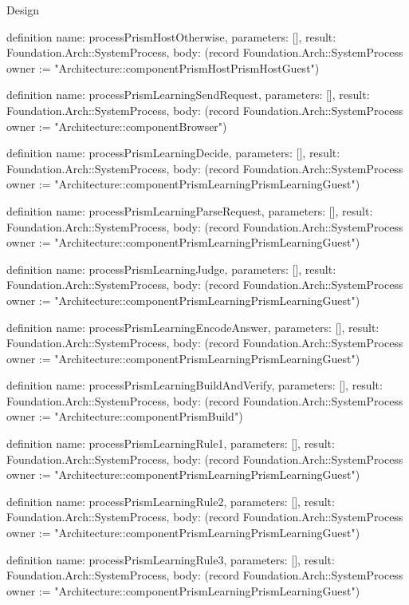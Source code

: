 \begin{lexlean}{Design}
\begin{semanticmodule}
definition{
  name: processPrismHostOtherwise,
  parameters: [],
  result: Foundation.Arch::SystemProcess,
  body: (record Foundation.Arch::SystemProcess {owner := "Architecture::componentPrismHostPrismHostGuest"})
}

definition{
  name: processPrismLearningSendRequest,
  parameters: [],
  result: Foundation.Arch::SystemProcess,
  body: (record Foundation.Arch::SystemProcess {owner := "Architecture::componentBrowser"})
}

definition{
  name: processPrismLearningDecide,
  parameters: [],
  result: Foundation.Arch::SystemProcess,
  body: (record Foundation.Arch::SystemProcess {owner := "Architecture::componentPrismLearningPrismLearningGuest"})
}

definition{
  name: processPrismLearningParseRequest,
  parameters: [],
  result: Foundation.Arch::SystemProcess,
  body: (record Foundation.Arch::SystemProcess {owner := "Architecture::componentPrismLearningPrismLearningGuest"})
}

definition{
  name: processPrismLearningJudge,
  parameters: [],
  result: Foundation.Arch::SystemProcess,
  body: (record Foundation.Arch::SystemProcess {owner := "Architecture::componentPrismLearningPrismLearningGuest"})
}

definition{
  name: processPrismLearningEncodeAnswer,
  parameters: [],
  result: Foundation.Arch::SystemProcess,
  body: (record Foundation.Arch::SystemProcess {owner := "Architecture::componentPrismLearningPrismLearningGuest"})
}

definition{
  name: processPrismLearningBuildAndVerify,
  parameters: [],
  result: Foundation.Arch::SystemProcess,
  body: (record Foundation.Arch::SystemProcess {owner := "Architecture::componentPrismBuild"})
}

definition{
  name: processPrismLearningRule1,
  parameters: [],
  result: Foundation.Arch::SystemProcess,
  body: (record Foundation.Arch::SystemProcess {owner := "Architecture::componentPrismLearningPrismLearningGuest"})
}

definition{
  name: processPrismLearningRule2,
  parameters: [],
  result: Foundation.Arch::SystemProcess,
  body: (record Foundation.Arch::SystemProcess {owner := "Architecture::componentPrismLearningPrismLearningGuest"})
}

definition{
  name: processPrismLearningRule3,
  parameters: [],
  result: Foundation.Arch::SystemProcess,
  body: (record Foundation.Arch::SystemProcess {owner := "Architecture::componentPrismLearningPrismLearningGuest"})
}


\end{semanticmodule}
\end{lexlean}
